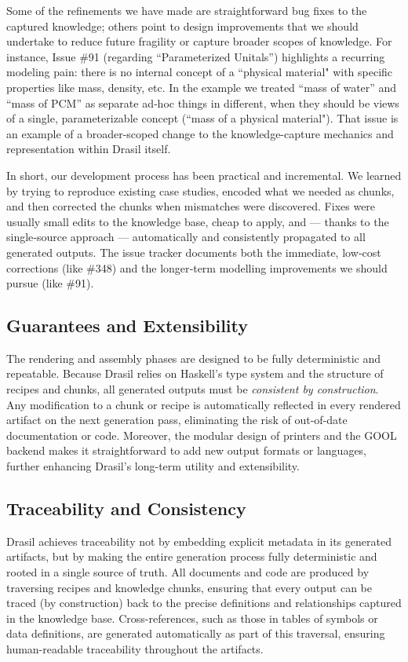 Some of the refinements we have made are straightforward bug fixes to 
the captured knowledge; others point to design improvements that we should 
undertake to reduce future fragility or capture broader scopes of knowledge. 
For instance, Issue \#91 (regarding ``Parameterized Unitals'') highlights a 
recurring modeling pain: there is no internal concept of a ``physical material" 
with specific properties like mass, density, etc. In the \sw{} example we 
treated ``mass of water'' and ``mass of PCM'' as separate ad‑hoc things in 
different, when they should be views of a single, parameterizable concept 
(``mass of a physical material"). That issue is an example of a broader-scoped 
change to the knowledge-capture mechanics and representation within Drasil 
itself.

In short, our development process has been practical and incremental. We 
learned by trying to reproduce existing case studies, encoded what we needed as 
chunks, and then corrected the chunks when mismatches were discovered. Fixes 
were usually small edits to the knowledge base, cheap to apply, and — thanks to 
the single‑source approach — automatically and consistently propagated to all 
generated outputs. The issue tracker documents both the immediate, low‑cost 
corrections (like \#348) and the longer‑term modelling improvements we should 
pursue (like \#91).

\subsection{Guarantees and Extensibility}

The rendering and assembly phases are designed to be fully deterministic and 
repeatable. Because Drasil relies on Haskell's type system and the structure of 
recipes and chunks, all generated outputs must be \emph{consistent by 
construction}. Any modification to a chunk or recipe is automatically reflected 
in every rendered artifact on the next generation pass, eliminating the risk of 
out-of-date documentation or code. Moreover, the modular design of printers and 
the GOOL backend makes it straightforward to add new output formats or 
languages, further enhancing Drasil's long-term utility and extensibility.

\subsection{Traceability and Consistency}

Drasil achieves traceability not by embedding explicit metadata in its 
generated artifacts, but by making the entire generation process fully 
deterministic  and rooted in a single source 
of truth. All documents and code 
are produced by traversing recipes and knowledge chunks, ensuring that every 
output can be traced (by construction) back to the precise definitions and 
relationships captured in the knowledge base. Cross-references, such as those 
in tables of symbols or data definitions, are generated automatically as part 
of this traversal, ensuring human-readable traceability throughout the 
artifacts.

